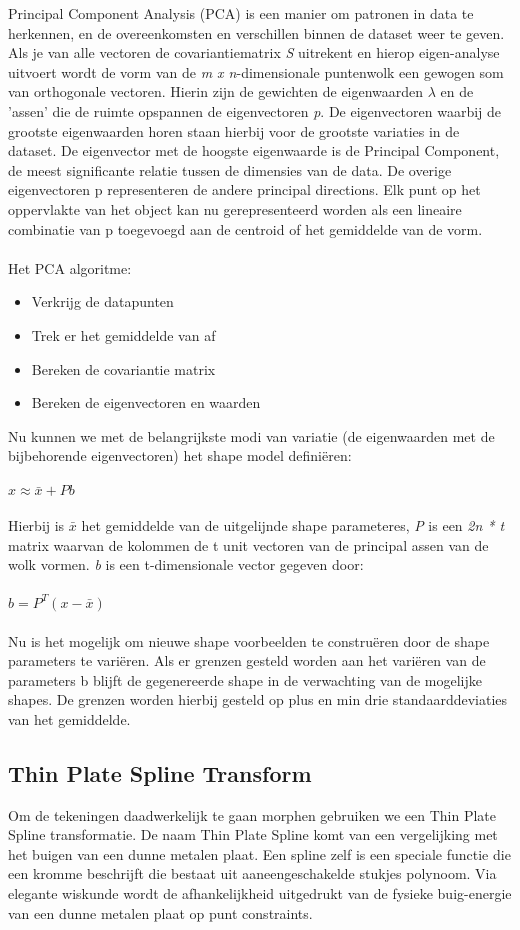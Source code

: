 Principal Component Analysis (PCA) is een manier om patronen in data te herkennen, en de overeenkomsten en verschillen binnen de dataset weer te geven.\cite{pca}
Als je van alle vectoren de covariantiematrix \textit{S} uitrekent en hierop eigen-analyse uitvoert wordt de vorm van de \textit{m x n}-dimensionale puntenwolk een gewogen som van orthogonale vectoren. 
Hierin zijn de gewichten de eigenwaarden $\lambda$ en de 'assen' die de ruimte opspannen de eigenvectoren \textit{p}. 
De eigenvectoren waarbij de grootste eigenwaarden horen staan hierbij voor de grootste variaties in de dataset. 
De eigenvector met de hoogste eigenwaarde is de Principal Component, de meest significante relatie tussen de dimensies van de data. 
De overige eigenvectoren p representeren de andere principal directions. Elk punt op het oppervlakte van het object kan nu gerepresenteerd worden als een lineaire combinatie van p toegevoegd aan de centroid of het gemiddelde van de vorm.
\\
\\
Het PCA algoritme:
\begin{itemize}
\item Verkrijg de datapunten
\item Trek er het gemiddelde van af
\item Bereken de covariantie matrix
\item Bereken de eigenvectoren en waarden
\end{itemize}
\noindent
Nu kunnen we met de belangrijkste modi van variatie (de eigenwaarden met de bijbehorende eigenvectoren) het shape model defini\"{e}ren:
\\
\\
$x \approx \bar{x} + Pb$
\\
\\
Hierbij is $\bar{x}$ het gemiddelde van de uitgelijnde shape parameteres, \textit{P} is een \textit{2n * t} matrix waarvan de kolommen de t unit vectoren van de principal assen van de wolk vormen. \textit{b} is een t-dimensionale vector gegeven door:
\\
\\
$b = P^{T}(x-\bar{x})$
\\
\\
Nu is het mogelijk om nieuwe shape voorbeelden te constru\"{e}ren door de shape parameters te vari\"{e}ren. Als er grenzen gesteld worden aan het vari\"{e}ren van de parameters b blijft de gegenereerde shape in de verwachting van de mogelijke shapes. De grenzen worden hierbij gesteld op plus en min drie standaarddeviaties van het gemiddelde.


\subsection{Thin Plate Spline Transform}
Om de tekeningen daadwerkelijk te gaan morphen gebruiken we een Thin Plate Spline transformatie. De naam Thin Plate Spline 
komt van een vergelijking met het buigen van een dunne metalen plaat.\cite{tps} 
Een spline zelf is een speciale functie die een kromme beschrijft die bestaat uit aaneengeschakelde stukjes polynoom.
Via elegante wiskunde wordt de afhankelijkheid uitgedrukt van de fysieke buig-energie van een dunne metalen plaat op punt constraints.\cite{tps2}
